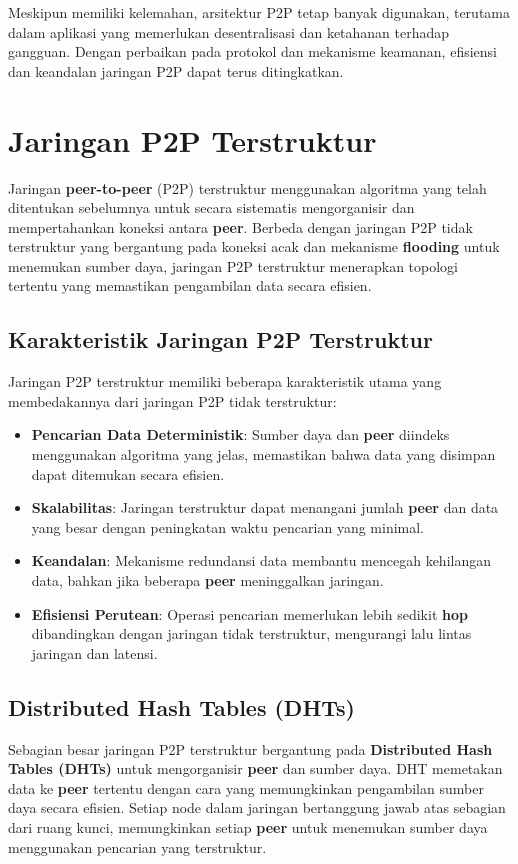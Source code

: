 Meskipun memiliki kelemahan, arsitektur P2P tetap banyak digunakan, terutama dalam aplikasi yang memerlukan desentralisasi dan ketahanan terhadap gangguan. Dengan perbaikan pada protokol dan mekanisme keamanan, efisiensi dan keandalan jaringan P2P dapat terus ditingkatkan.



\section{Jaringan P2P Terstruktur}

Jaringan \textbf{peer-to-peer} (P2P) terstruktur menggunakan algoritma yang telah ditentukan sebelumnya untuk secara sistematis mengorganisir dan mempertahankan koneksi antara \textbf{peer}. Berbeda dengan jaringan P2P tidak terstruktur yang bergantung pada koneksi acak dan mekanisme \textbf{flooding} untuk menemukan sumber daya, jaringan P2P terstruktur menerapkan topologi tertentu yang memastikan pengambilan data secara efisien.

\subsection{Karakteristik Jaringan P2P Terstruktur}
Jaringan P2P terstruktur memiliki beberapa karakteristik utama yang membedakannya dari jaringan P2P tidak terstruktur:
\begin{itemize}
	\item \textbf{Pencarian Data Deterministik}: Sumber daya dan \textbf{peer} diindeks menggunakan algoritma yang jelas, memastikan bahwa data yang disimpan dapat ditemukan secara efisien.
	\item \textbf{Skalabilitas}: Jaringan terstruktur dapat menangani jumlah \textbf{peer} dan data yang besar dengan peningkatan waktu pencarian yang minimal.
	\item \textbf{Keandalan}: Mekanisme redundansi data membantu mencegah kehilangan data, bahkan jika beberapa \textbf{peer} meninggalkan jaringan.
	\item \textbf{Efisiensi Perutean}: Operasi pencarian memerlukan lebih sedikit \textbf{hop} dibandingkan dengan jaringan tidak terstruktur, mengurangi lalu lintas jaringan dan latensi.
\end{itemize}

\subsection{Distributed Hash Tables (DHTs)}
Sebagian besar jaringan P2P terstruktur bergantung pada \textbf{Distributed Hash Tables (DHTs)} untuk mengorganisir \textbf{peer} dan sumber daya. DHT memetakan data ke \textbf{peer} tertentu dengan cara yang memungkinkan pengambilan sumber daya secara efisien. Setiap node dalam jaringan bertanggung jawab atas sebagian dari ruang kunci, memungkinkan setiap \textbf{peer} untuk menemukan sumber daya menggunakan pencarian yang terstruktur.

